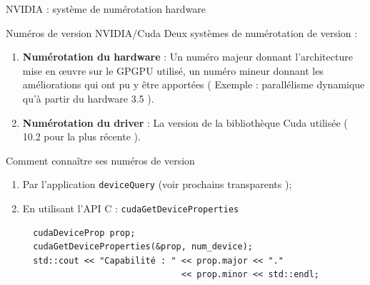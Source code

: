 \documentclass[handout,francais]{beamer}
\begin{document}
\begin{frame}[fragile]{NVIDIA : système de numérotation hardware}
\scriptsize
 \begin{block}{Numéros de version NVIDIA/Cuda}
 Deux systèmes de numérotation de version :
 \begin{enumerate}
 \item \textbf{Numérotation du hardware} : Un numéro majeur donnant l'architecture mise en {\oe}uvre sur le GPGPU utilisé, un numéro
 mineur donnant les améliorations qui ont pu y être apportées ( Exemple : parallélisme dynamique qu'à partir du hardware 3.5 ). 
 \item \textbf{Numérotation du driver} : La version de la bibliothèque Cuda utilisée ( 10.2 pour la plus récente ).
 \end{enumerate}
 \end{block}
 
 \begin{block}{Comment connaître ses numéros de version}
 \begin{enumerate}
  \item Par l'application \texttt{deviceQuery} (voir prochains transparents );
  \item En utilisant l'API C : \texttt{cudaGetDeviceProperties}
  \begin{lstlisting}
  cudaDeviceProp prop;
  cudaGetDeviceProperties(&prop, num_device);
  std::cout << "Capabilité : " << prop.major << "." 
                               << prop.minor << std::endl;
  \end{lstlisting}
 \end{enumerate}
 \end{block}
\end{frame}
\end{document}
